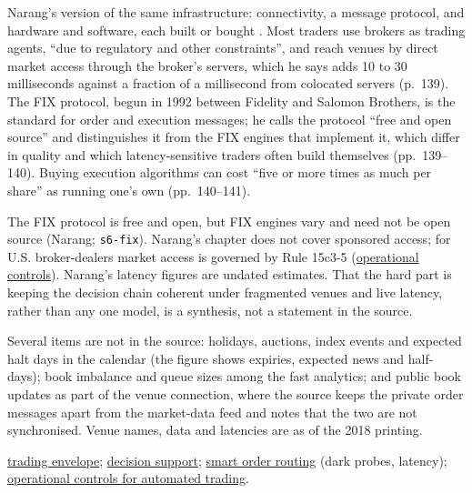 \begin{qfdefinition}
Narang's version of the same infrastructure: connectivity, a message protocol, and hardware and software, each built or bought \citep[chap.~7, ``Execution'', sec.~7.2, pp.~138--140]{s7-narang}. Most traders use brokers as trading agents, ``due to regulatory and other constraints'', and reach venues by direct market access through the broker's servers, which he says adds 10 to 30 milliseconds against a fraction of a millisecond from colocated servers (p.~139). The FIX protocol, begun in 1992 between Fidelity and Salomon Brothers, is the standard for order and execution messages; he calls the protocol ``free and open source'' and distinguishes it from the FIX engines that implement it, which differ in quality and which latency-sensitive traders often build themselves (pp.~139--140). Buying execution algorithms can cost ``five or more times as much per share'' as running one's own (pp.~140--141).

 The FIX protocol is free and open, but FIX engines vary and need not be open source (Narang; \nolinkurl{s6-fix}). Narang's chapter does not cover sponsored access; for U.S. broker-dealers market access is governed by Rule 15c3-5 (\hyperref[meth:automated-trading-operational-controls]{operational controls}). Narang's latency figures are undated estimates. That the hard part is keeping the decision chain coherent under fragmented venues and live latency, rather than any one model, is a synthesis, not a statement in the source.

Several items are not in the source: holidays, auctions, index events and expected halt days in the calendar (the figure shows expiries, expected news and half-days); book imbalance and queue sizes among the fast analytics; and public book updates as part of the venue connection, where the source keeps the private order messages apart from the market-data feed and notes that the two are not synchronised. Venue names, data and latencies are as of the 2018 printing.

 \hyperref[def:trading-envelope]{trading envelope}; \hyperref[meth:execution-decision-support]{decision support}; \hyperref[def:smart-order-routing]{smart order routing} (dark probes, latency); \hyperref[meth:automated-trading-operational-controls]{operational controls for automated trading}.

\end{qfdefinition}

